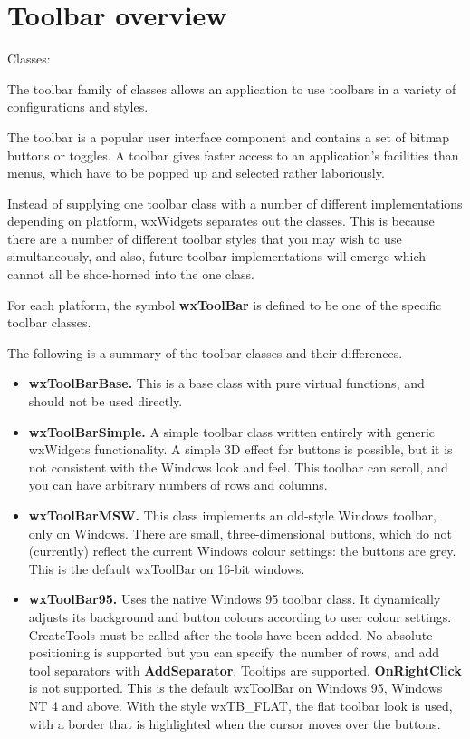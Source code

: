 \section{Toolbar overview}\label{wxtoolbaroverview}

Classes: 

The toolbar family of classes allows an application to use toolbars
in a variety of configurations and styles.

The toolbar is a popular user interface component and contains a set of bitmap
buttons or toggles. A toolbar gives faster access to an application's facilities than
menus, which have to be popped up and selected rather laboriously.

Instead of supplying one toolbar class with a number
of different implementations depending on platform, wxWidgets separates
out the classes. This is because there are a number of different toolbar
styles that you may wish to use simultaneously, and also, future
toolbar implementations will emerge which
cannot all be shoe-horned into the one class.

For each platform, the symbol {\bf wxToolBar} is defined to be one of the
specific toolbar classes.

The following is a summary of the toolbar classes and their differences.

\begin{itemize}\itemsep=0pt
\item {\bf wxToolBarBase.} This is a base class with pure virtual functions,
and should not be used directly.
\item {\bf wxToolBarSimple.} A simple toolbar class written entirely with generic wxWidgets
functionality. A simple 3D effect for buttons is possible, but it is not consistent
with the Windows look and feel. This toolbar can scroll, and you can have arbitrary
numbers of rows and columns.
\item {\bf wxToolBarMSW.} This class implements an old-style Windows toolbar, only on
Windows. There are small, three-dimensional buttons, which do not (currently) reflect
the current Windows colour settings: the buttons are grey. This is the default wxToolBar
on 16-bit windows.
\item {\bf wxToolBar95.} Uses the native Windows 95 toolbar class. It dynamically adjusts its
background and button colours according to user colour settings.
CreateTools must be called after the tools have been added.
No absolute positioning is supported but you can specify the number
of rows, and add tool separators with {\bf AddSeparator}.
Tooltips are supported. {\bf OnRightClick} is not supported. This is the default wxToolBar
on Windows 95, Windows NT 4 and above. With the style wxTB\_FLAT, the flat toolbar
look is used, with a border that is highlighted when the cursor moves over the buttons.
\end{itemize}

